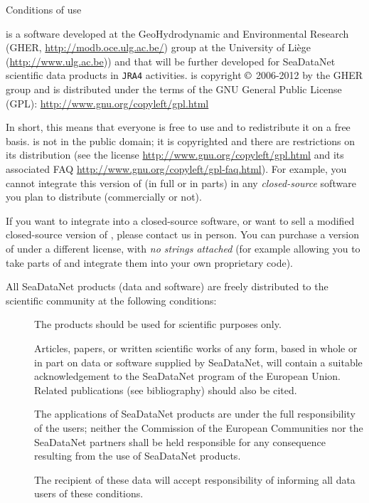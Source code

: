 
\vspace*{\fill}

\begin{center}
\begin{minipage}[c]{.85\textwidth}

\Large{Conditions of use}
\vspace{1cm}
\normalsize


\vspace{.25cm}
\diva is a software developed at the GeoHydrodynamic and Environmental Research (GHER, \url{http://modb.oce.ulg.ac.be/}) group at the University of Liège (\url{http://www.ulg.ac.be})) and that will be further developed for SeaDataNet scientific data products in \texttt{JRA4} activities. \diva is copyright $\copyright$  2006-2012 by the GHER group and is distributed under the terms of the GNU General Public License (GPL): \url{http://www.gnu.org/copyleft/gpl.html}

In short, this means that everyone is free to use \diva and to redistribute it on a free basis. \diva is not in the public domain; it is copyrighted and there are restrictions on its distribution (see the license \url{http://www.gnu.org/copyleft/gpl.html} and its associated FAQ \url{http://www.gnu.org/copyleft/gpl-faq.html}). For example, you cannot integrate this version of \diva (in full or in parts) in any \textit{closed-source} software you plan to distribute (commercially or not).

If you want to integrate \diva into a closed-source software, or want to sell a modified closed-source version of \diva, please contact us in person. You can purchase a version of \diva under a different license, with \textit{no strings attached} (for example allowing you to take parts of \diva and integrate them into your own proprietary code).

\vspace{.25cm}
All SeaDataNet products (data and software) are freely distributed to the scientific community at the following conditions: 

\begin{description}
\item[\checkmark] The products should be used for scientific purposes only.
\item[\checkmark] Articles, papers, or written scientific works of any form, based in whole or in part on data or software supplied by SeaDataNet, will contain a suitable acknowledgement to the SeaDataNet program of the European Union. Related publications (see bibliography) should also be cited.
\item[\checkmark] The applications of SeaDataNet products are under the full responsibility of the users; neither the Commission of the European Communities nor the SeaDataNet partners shall be held responsible for any consequence resulting from the use of SeaDataNet products. 
\item[\checkmark] The recipient of these data will accept responsibility of informing all data users of these conditions.
\end{description}


\end{minipage}
\end{center}
